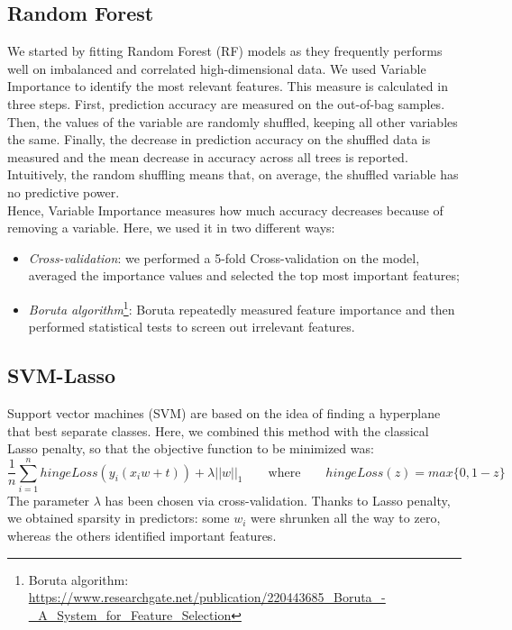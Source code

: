 \documentclass[a4paper,11pt, oneside]{article}  %
\begin{document}
	\subsection{Random Forest}
	We started by fitting Random Forest (RF) models as they frequently performs well on imbalanced and correlated high-dimensional data. We used Variable Importance to identify the most relevant features. This measure is calculated in three steps. First, prediction accuracy are measured on the out-of-bag samples. Then, the values of the variable are randomly shuffled, keeping all other variables the same. Finally, the decrease in prediction accuracy on the shuffled data is measured and the mean decrease in accuracy across all trees is reported.  Intuitively, the random shuffling means that, on average, the shuffled variable has no predictive power. \\
Hence, Variable Importance measures how much accuracy decreases because of removing a variable. Here, we used it in two different ways:
	\begin{itemize}
		\item \textit{Cross-validation}: we performed a 5-fold Cross-validation on the model, averaged the importance values and selected the top most important features;
		\item \textit{Boruta algorithm}\footnote{Boruta algorithm: \url{https://www.researchgate.net/publication/220443685_Boruta_-_A_System_for_Feature_Selection}}: Boruta repeatedly measured feature importance and then performed statistical tests to screen out irrelevant features. 
	\end{itemize} 
	
	\subsection{SVM-Lasso}
	Support vector machines (SVM) are based on the idea of finding a hyperplane that best separate classes. Here, we combined this method with the classical Lasso penalty, so that the objective function to be minimized was:
	\begin{equation*}
		\dfrac{1}{n} \sum_{i=1}^n hingeLoss(y_i(x_i w + t)) + \lambda ||w||_1  \qquad	\text{where} \qquad  hingeLoss(z) = max\{0, 1-z\}
	\end{equation*}
	The parameter $\lambda$ has been chosen via cross-validation. Thanks to Lasso penalty, we obtained sparsity in predictors: some $w_i$ were shrunken all the way to zero, whereas the others identified important features. 
	
\end{document}
